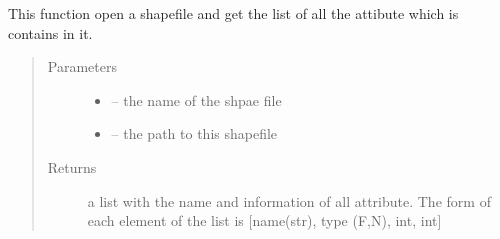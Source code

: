 \documentclass[letterpaper,10pt,english]{sphinxmanual}
\begin{document}
\begin{fulllineitems}
\label{\detokenize{index:src.substrate.get_all_attribute}}
This function open a shapefile and get the list of all the attibute which is contains in it.
\begin{quote}\begin{description}
\item[{Parameters}] \leavevmode\begin{itemize}
\item {} 
 -- the name of the shpae file

\item {} 
 -- the path to this shapefile

\end{itemize}

\item[{Returns}] \leavevmode
a list with the name and information of all attribute. The form of each element of the list
is {[}name(str), type (F,N), int, int{]}

\end{description}\end{quote}

\end{fulllineitems}

\end{document}
